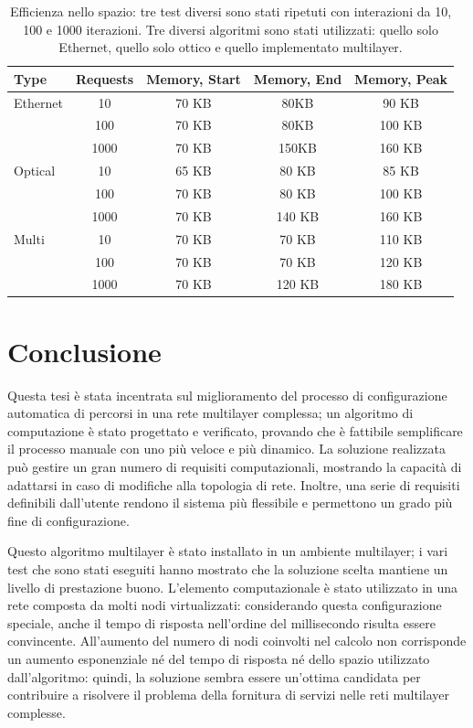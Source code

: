 \documentclass[10pt,a4paper]{report}
\begin{document}
\begin{table}[!htbp]
  \begin{center}
    \begin{tabular}{|l|c|c|c|c|}
      \hline
      \textbf{Type} & \textbf{Requests} & \textbf{Memory, Start}
      & \textbf{Memory, End} & \textbf{Memory, Peak} \\ \hline
      Ethernet & 10 & 70 KB & 80KB & 90 KB \\
      & 100 & 70 KB & 80KB & 100 KB \\
      & 1000 & 70 KB & 150KB & 160 KB \\ \hline
      Optical & 10 & 65 KB & 80 KB & 85 KB \\
      & 100 & 70 KB & 80 KB & 100 KB \\
      & 1000 & 70 KB & 140 KB & 160 KB \\ \hline
      Multi & 10 & 70 KB & 70 KB & 110 KB \\
      & 100 & 70 KB & 70 KB & 120 KB \\
      & 1000 & 70 KB & 120 KB & 180 KB \\
      \hline
    \end{tabular}
    \caption[]{Efficienza nello spazio: tre test diversi sono stati
      ripetuti con interazioni da 10, 100 e 1000 iterazioni. Tre
      diversi algoritmi sono stati utilizzati: quello solo Ethernet,
      quello solo ottico e quello implementato multilayer.}
  \end{center}
\end{table}

\section*{Conclusione}

Questa tesi è stata incentrata sul miglioramento del processo di
configurazione automatica di percorsi in una rete multilayer
complessa; un algoritmo di computazione è stato progettato e
verificato, provando che è fattibile semplificare il processo manuale
con uno più veloce e più dinamico. La soluzione realizzata può gestire
un gran numero di requisiti computazionali, mostrando la capacità di
adattarsi in caso di modifiche alla topologia di rete. Inoltre, una
serie di requisiti definibili dall'utente rendono il sistema più
flessibile e permettono un grado più fine di configurazione.

Questo algoritmo multilayer è stato installato in un ambiente
multilayer; i vari test che sono stati eseguiti hanno mostrato che la
soluzione scelta mantiene un livello di prestazione buono. L'elemento
computazionale è stato utilizzato in una rete composta da molti nodi
virtualizzati: considerando questa configurazione speciale, anche il
tempo di risposta nell'ordine del millisecondo risulta essere
convincente. All'aumento del numero di nodi coinvolti nel calcolo non
corrisponde un aumento esponenziale né del tempo di risposta né dello
spazio utilizzato dall'algoritmo: quindi, la soluzione sembra essere
un'ottima candidata per contribuire a risolvere il problema della
fornitura di servizi nelle reti multilayer complesse.
\end{document}
